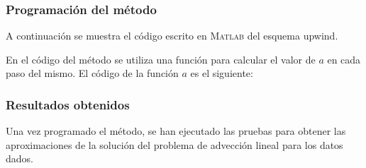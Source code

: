 \documentclass[spanish]{mathnotes}
\begin{document}
	\subsubsection{Programación del método}
	A continuación se muestra el código escrito en \textsc{Matlab} del esquema upwind.
	\lstset{style=matlabStyle}
	
	En el código del método se utiliza una función para calcular el valor de $a$ en cada paso del mismo. El código de la función $a$ es el siguiente:
	\lstset{style=matlabStyle}
	
	\subsubsection{Resultados obtenidos}
	Una vez programado el método, se han ejecutado las pruebas para obtener las aproximaciones de la solución del problema de advección lineal para los datos dados. 
\end{document}
